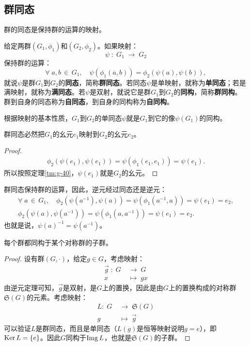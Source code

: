 \documentclass[12pt,UTF8,fontset=none]{ctexbook}
\begin{document}
\subsection{群同态}

群的同态是保持群的运算的映射。
\begin{df}
    给定两群$(G_1, \phi_1)$和$(G_2, \phi_2)$。如果映射：
    $$ \psi \;:\; G_1 \; \longrightarrow \; G_2$$
    保持群的运算：
    $$ \forall \; a, b\, \in \, G_1, \quad \psi(\phi_1(a,b)) = \phi_2(\psi(a), \psi(b)), $$
    就说$\psi$是群$G_1$到$G_2$的\textbf{同态}，简称\textbf{群同态}。若同态$\psi$是单映射，就称为\textbf{单同态}；若是满映射，就称为\textbf{满同态}。若$\psi$是双射，就说它是群$G_1$到$G_2$的\textbf{同构}，简称\textbf{群同构}。群到自身的同态称为\textbf{自同态}，到自身的同构称为\textbf{自同构}。
\end{df}
根据映射的基本性质，$G_1$到$G_2$的单同态$\psi$就是$G_1$到它的像$\psi(G_1)$的同构。

\begin{tm}
    群同态必然把$G_1$的幺元$e_1$映射到$G_2$的幺元$e_2$。
\end{tm}
\begin{proof}
\begin{align*}
    \phi_2(\psi(e_1),\psi(e_1)) = \psi(\phi_1(e_1, e_1)) = \psi(e_1).
\end{align*}
所以按照定理\ref{tm:g-40}，$\psi(e_1)$就是$G_2$的幺元。
\end{proof}

群同态保持群的运算，因此，逆元经过同态还是逆元：
\begin{align*}
    \forall \; a\, \in \, G_1, \quad \phi_2(\psi(a^{-1}), \psi(a)) = \psi(\phi_1(a^{-1}, a)) = \psi(e_1) = e_2, \\
    \phi_2(\psi(a), \psi(a^{-1})) = \psi(\phi_1(a, a^{-1})) = \psi(e_1) = e_2.
\end{align*}
也就是说，$\psi(a)^{-1} = \psi(a^{-1})$。

\begin{tm}
    每个群都同构于某个对称群的子群。
\end{tm}
\begin{proof}    
    设有群$(G,\cdot)$，给定$g\in G$，考虑映射：
    \begin{align*}
        \overrightarrow{g}\;: \; G \; &\longrightarrow \; G \\
    x \;&\longmapsto \;gx
    \end{align*}
    由逆元定理可知，$\overrightarrow{g}$是双射，是$G$上的置换，因此是由$G$上的置换构成的对称群$\mathfrak{S}(G)$的元素。考虑映射：
    \begin{align*}
        L: \; G  \; &\longrightarrow \; \mathfrak{S}(G) \\
        g \;&\longmapsto \;\overrightarrow{g}
    \end{align*}
    可以验证$L$是群同态，而且是单同态（$L(g)$是恒等映射说明$g = e$），即$\mathrm{Ker\,} L = \{e\}$。因此$G$同构于$\mathrm{Img\,} L$，也就是$\mathfrak{S}(G)$的子群。
\end{proof}
\end{document}
